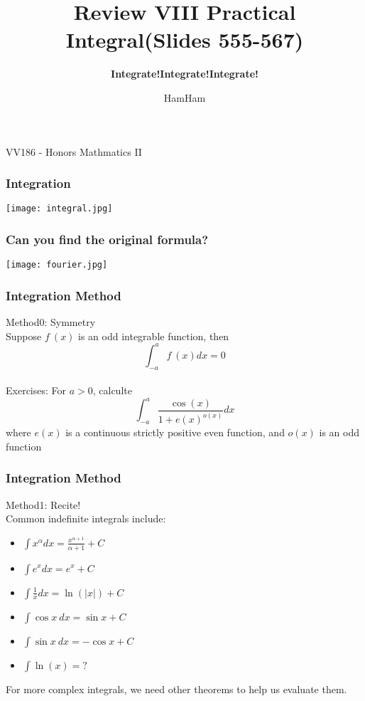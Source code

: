 \documentclass{beamer}
\title{\sffamily Review VIII Practical Integral(Slides 555-567)}
\subtitle{\textbf{Integrate!Integrate!Integrate!}\\}
\institute[UM-SJTU JI]{University of Michigan-Shanghai Jiao Tong University Joint Institute}
\author{HamHam}
\newcommand{\myfont}{\rmfamily\normalsize\upshape\mdseries}
\begin{document}
\begin{titlepage}
    \begin{center}
        VV186 - Honors Mathmatics II
    \end{center}
\end{titlepage}
\myfont

\begin{frame}
    \frametitle{Integration}
    \centering
    \texttt{[image: integral.jpg]}
\end{frame}
\begin{frame}
    \frametitle{Can you find the original formula?}
    \centering
    \texttt{[image: fourier.jpg]}
\end{frame}
\begin{frame}
    \frametitle{Integration Method}
    Method0: Symmetry\\
    \vspace{1em}\hspace{1em}
    Suppose $f~(x)$ is an odd integrable function, then $$\int_{-a}^a f~(x)dx=0$$
    \\
    \vspace{1em}
    \hspace{1em} Exercises: For $a>0$, calculte 
    $$\int_{-a}^a \frac{\cos(x)}{1+e(x)^{o(x)}} dx$$
    where $e(x)$ is a continuous strictly positive even function, and $o(x)$ is an odd function
\end{frame}
\begin{frame}
    \frametitle{Integration Method}
    Method1: Recite!\\
    \vspace{1em}
    Common indefinite integrals include:
    \begin{itemize}
        \item $\int x^\alpha dx=\frac{x^{\alpha+1}}{\alpha+1} +C$
        \item $\int e^x dx=e^x +C $
        \item $\int \frac{1}{x}dx=\ln(|x|)+C$
        \item $\int \cos x~ dx = \sin x +C$
        \item $\int \sin x~ dx = -\cos x +C$
        \item $\int \ln(x)= ?$
    \end{itemize}
    For more complex integrals, we need other theorems to help us evaluate
them.
\end{frame}
\end{document}
